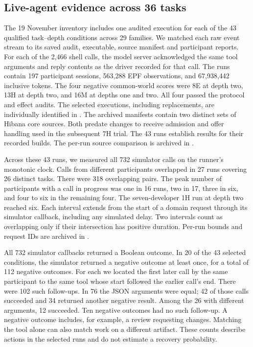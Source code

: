 \documentclass[10pt]{article}
\begin{document}
\subsection{Live-agent evidence across 36 tasks}
The 19 November inventory includes one audited execution for each of the
43 qualified task--depth conditions across 29 families. We matched each raw
event stream to its saved audit, executable, source manifest and participant
reports. For each of the 2,466 shell calls, the model server acknowledged the
same tool arguments and reply contents as the driver recorded for that call.
The runs contain 197 participant sessions, 563,288 EPF observations,
and 67,938,442 inclusive tokens. The four negative common-world scores were
8E at depth two, 13H at depth two, and 16M at depths one and two. All four
passed the protocol and effect audits. The selected executions, including
replacements, are individually identified in
.
The archived manifests contain two distinct sets of Hibana core sources.
Both predate changes to receive admission and offer handling used in the
subsequent 7H trial. The 43 runs establish results for their recorded
builds. The per-run source comparison is archived in
.

Across these 43 runs, we measured all 732 simulator calls on the runner's
monotonic clock. Calls from different participants overlapped in 27 runs
covering 26 distinct tasks. There were 318 overlapping pairs. The peak number
of participants with a call in progress was one in 16 runs, two in 17,
three in six, and four to six in the remaining four. The seven-developer
1H run at depth two reached six. Each interval extends from the start of
a domain request through its simulator callback, including any simulated
delay. Two intervals count as overlapping only if their intersection has
positive duration. Per-run bounds and request IDs are archived in
.

All 732 simulator callbacks returned a Boolean outcome. In 20 of the
43 selected conditions, the simulator returned a negative outcome at least
once, for a total of 112 negative outcomes. For each we located the first
later call by the same participant to the same tool whose start followed
the earlier call's end. There were 102 such follow-ups. In 76 the JSON
arguments were equal; 42 of those calls succeeded and 34 returned another
negative result. Among the 26 with different arguments, 12 succeeded.
Ten negative outcomes had no such follow-up. A negative outcome includes,
for example, a review requesting changes. Matching the tool alone can
also match work on a different artifact. These counts describe actions
in the selected runs and do not estimate a recovery probability.
\end{document}
